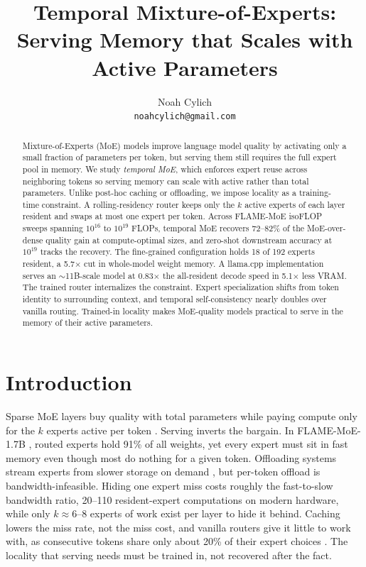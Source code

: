 \documentclass{article}
\title{Temporal Mixture-of-Experts:\\ Serving Memory that Scales with Active Parameters}
\author{%
  Noah Cylich\\
  \texttt{noahcylich@gmail.com}\\
}
\begin{document}
\maketitle

\begin{abstract}\normalsize
Mixture-of-Experts (MoE) models improve language model quality by activating only a small fraction
of parameters per token, but serving them still requires the full expert pool in memory. We study
\emph{temporal MoE}, which enforces expert reuse across neighboring tokens so serving memory can
scale with active rather than total parameters. Unlike post-hoc caching or offloading, we impose
locality as a training-time constraint. A rolling-residency router keeps only the $k$ active experts
of each layer resident and swaps at most one expert per token. Across FLAME-MoE isoFLOP sweeps
spanning $10^{16}$ to $10^{19}$ FLOPs, temporal MoE recovers 72--82\% of the MoE-over-dense
quality gain at compute-optimal sizes, and zero-shot downstream accuracy at $10^{19}$ tracks the
recovery. The fine-grained configuration holds 18 of 192 experts resident, a 5.7$\times$ cut in
whole-model weight memory. A llama.cpp implementation serves an $\sim$11B-scale model at 0.83$\times$
the all-resident decode speed in 5.1$\times$ less VRAM. The trained
router internalizes the constraint. Expert specialization shifts from token identity to
surrounding context, and temporal self-consistency nearly doubles over vanilla routing.
Trained-in locality makes MoE-quality models practical to serve in the memory of their active
parameters.
\end{abstract}

\section{Introduction}

Sparse MoE layers buy quality with total parameters while paying compute only for the $k$ experts
active per token \cite{shazeer2017,dai2024deepseekmoe,jiang2024mixtral}. Serving inverts the
bargain. In FLAME-MoE-1.7B \cite{kang2025flame}, routed experts hold 91\% of all weights, yet every
expert must sit in fast memory even though most do nothing for a given token. Offloading systems
stream experts from slower storage on demand \cite{eliseev2023,skliar2024}, but per-token offload
is bandwidth-infeasible. Hiding one expert miss costs roughly the fast-to-slow bandwidth ratio,
20--110 resident-expert computations on modern hardware, while only $k\!\approx\!6$--$8$ experts of
work exist per layer to hide it behind. Caching lowers the miss rate, not the miss cost, and
vanilla routers give it little to work with, as consecutive tokens share only about 20\% of their
expert choices \cite{jiang2024mixtral,muennighoff2024olmoe,liang2025local}. The locality that serving
needs must be trained in, not recovered after the fact.
\end{document}
